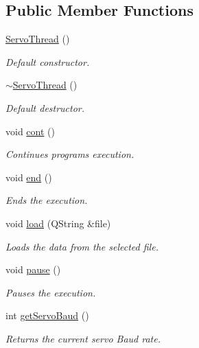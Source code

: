 \subsection*{Public Member Functions}
\begin{DoxyCompactItemize}
\item 
\hyperlink{class_servo_thread_af021de9817b11968dd627186e9e05a71}{Servo\+Thread} ()
\begin{DoxyCompactList}\small\item\em Default constructor. \end{DoxyCompactList}\item 
\hyperlink{class_servo_thread_a0c7ac1f603a247eac91d9780ad50f5fa}{$\sim$\+Servo\+Thread} ()
\begin{DoxyCompactList}\small\item\em Default destructor. \end{DoxyCompactList}\item 
void \hyperlink{class_servo_thread_a01c61d9505a2aeaa1a4fa4c05474738c}{cont} ()
\begin{DoxyCompactList}\small\item\em Continues program\textquotesingle{}s execution. \end{DoxyCompactList}\item 
void \hyperlink{class_servo_thread_aaa273318ffee5ba270cdaacba3f263f8}{end} ()
\begin{DoxyCompactList}\small\item\em Ends the execution. \end{DoxyCompactList}\item 
void \hyperlink{class_servo_thread_ae88d0a9c84099ca607c7cf929500fb26}{load} (Q\+String \&file)
\begin{DoxyCompactList}\small\item\em Loads the data from the selected file. \end{DoxyCompactList}\item 
void \hyperlink{class_servo_thread_ae0d4a59954aafbe8cd85f9326e4fcdd0}{pause} ()
\begin{DoxyCompactList}\small\item\em Pauses the execution. \end{DoxyCompactList}\item 
int \hyperlink{class_servo_thread_af2c9e71c33e15937e72703d859cd7147}{get\+Servo\+Baud} ()
\begin{DoxyCompactList}\small\item\em Returns the current servo Baud rate. \end{DoxyCompactList}\item 

\end{DoxyCompactItemize}
